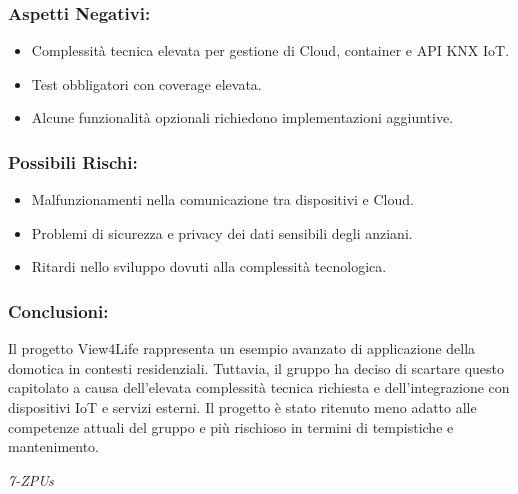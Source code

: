 \documentclass[a4paper,12pt]{article}
\begin{document}
\subsubsection*{Aspetti Negativi:}
\begin{itemize}
    \item Complessità tecnica elevata per gestione di Cloud, container e API KNX IoT.
    \item Test obbligatori con coverage elevata.
    \item Alcune funzionalità opzionali richiedono implementazioni aggiuntive.
\end{itemize}

\subsubsection*{Possibili Rischi:}
\begin{itemize}
    \item Malfunzionamenti nella comunicazione tra dispositivi e Cloud.
    \item Problemi di sicurezza e privacy dei dati sensibili degli anziani.
    \item Ritardi nello sviluppo dovuti alla complessità tecnologica.
\end{itemize}

\subsubsection*{Conclusioni:}
Il progetto View4Life rappresenta un esempio avanzato di applicazione della domotica in contesti residenziali. Tuttavia, il gruppo ha deciso di scartare questo capitolato a causa dell'elevata complessità tecnica richiesta e dell'integrazione con dispositivi IoT e servizi esterni. Il progetto è stato ritenuto meno adatto alle competenze attuali del gruppo e più rischioso in termini di tempistiche e mantenimento.

\vspace{0.5cm}

\vfill
\begin{flushright}
    \textit{7-ZPUs}
\end{flushright}
\end{document}
